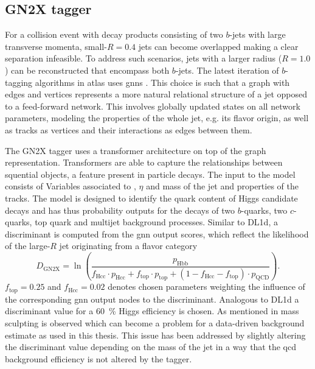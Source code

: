 \subsection{GN2X tagger}\label{sec:gn2x}
For a collision event with decay products consisting of two $b$-jets with large transverse momenta, small-$R=0.4$ jets can become overlapped making a clear separation infeasible. To address such scenarios, jets with a larger radius ($R=1.0$) can be reconstructed that encompass both $b$-jets. The latest iteration of $b$-tagging algorithms in \ac{atlas} uses \acp{gnn} \citep{shlomi2020graph, ATL-PHYS-PUB-2022-027}. This choice is such that a graph with edges and vertices represents a more natural relational structure of a jet opposed to a feed-forward network. This involves globally updated states on all network parameters, modeling the properties of the whole jet, e.g. its flavor origin, as well as tracks as vertices and their interactions as edges between them. 

The GN2X tagger uses a transformer architecture \citep{ATL-PHYS-PUB-2023-021} on top of the graph representation. Transformers are able to capture the relationships between squential objects, a feature present in particle decays. The input to the model consists of Variables associated to  \pt, $\eta$ and mass of the jet and properties of the tracks. The model is designed to identify the quark content of Higgs candidate decays and has thus probability outputs for the decays of two $b$-quarks, two $c$-quarks, top quark and multijet background processes. Similar to DL1d, a discriminant is computed from the \ac{gnn} output scores, which reflect the likelihood of the large-$R$ jet originating from a flavor category
\begin{equation}
  D_{\text{GN2X}}=\ln\left({\frac{p_{\text{Hbb}}}{
    f_{\text{Hcc}}\cdot p_{\text{Hcc}}+
    f_{\text{top}}\cdot p_{\text{top}}+
    (1-f_{\text{Hcc}}-f_{\text{top}})\cdot p_{\text{QCD}}}}\right).
\end{equation}
$f_\text{top}=0.25$ and $f_\text{Hcc}=0.02$ denotes chosen parameters weighting the influence of the corresponding \ac{gnn} output nodes to the discriminant. Analogous to DL1d a discriminant value for a \qty[]{60}{\percent} Higgs efficiency is chosen. As mentioned in \citep{ATL-PHYS-PUB-2023-021} mass sculpting is observed which can become a problem for a data-driven background estimate as used in this thesis. This issue has been addressed by slightly altering the discriminant value depending on the mass of the jet in a way that the \ac{qcd} background efficiency is not altered by the tagger. 

